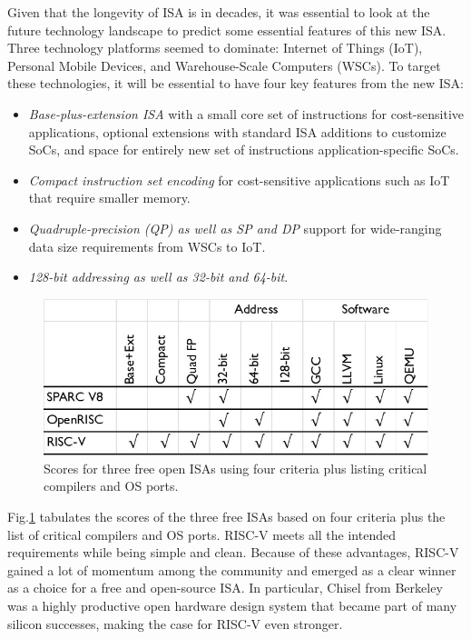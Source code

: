 \documentclass[journal]{IEEEtran}
\begin{document}
Given that the longevity of ISA is in decades, it was essential to look at the future technology landscape to predict some essential features of this new ISA. Three technology platforms seemed to dominate: Internet of Things (IoT), Personal Mobile Devices, and Warehouse-Scale Computers (WSCs). To target these technologies, it will be essential to have four key features from the new ISA:
\begin{itemize}
    \item \textit{Base-plus-extension ISA} with a small core set of instructions for cost-sensitive applications, optional extensions with standard ISA additions to customize SoCs, and space for entirely new set of instructions application-specific SoCs.
    \item \textit{Compact instruction set encoding} for cost-sensitive applications such as IoT that require smaller memory.
    \item \textit{Quadruple-precision (QP) as well as SP and DP} support for wide-ranging data size requirements from WSCs to IoT.
    \item \textit{128-bit addressing as well as 32-bit and 64-bit}.

\end{itemize}

\begin{figure}[htb]
    \centering
    \includegraphics[width=0.95\linewidth]{image-3FreeISA-Table.jpg}
    \caption{Scores for three free open ISAs using four criteria plus listing critical compilers and OS ports.}
    \label{fig:score}
\end{figure}

Fig.\ref{fig:score} tabulates the scores of the three free ISAs based on four criteria plus the list of critical compilers and OS ports. RISC-V meets all the intended requirements while being simple and clean. Because of these advantages, RISC-V gained a lot of momentum among the community and emerged as a clear winner as a choice for a free and open-source ISA. In particular, Chisel from Berkeley was a highly productive open hardware design system that became part of many silicon successes, making the case for RISC-V even stronger. 
\end{document}
